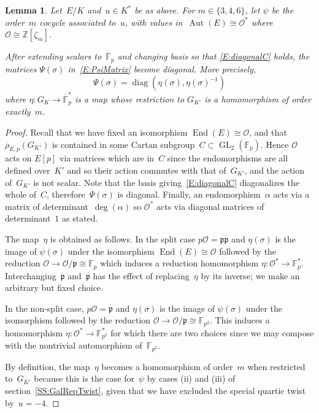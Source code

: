 \documentclass[twoside,leqno,symbols-for-thanks, draft]{rmi}
\numberwithin{equation}{section}
\newcommand{\F}{\mathbb{F}}
\newcommand{\Fp}{\mathbb{F}_p}
\newcommand{\Fpstar}{\mathbb{F}_p^*}
\newcommand{\Fbar}{{\overline{\F}}}
\newcommand{\Z}{\mathbb{Z}}
\newcommand{\rhobar}{{\overline{\rho}}}
\newcommand{\frp}{{\mathfrak p}}
\newcommand{\calO}{\mathcal{O}}
\DeclareMathOperator{\Aut}{Aut}
\DeclareMathOperator{\End}{End}
\newcommand{\GL}{\operatorname{GL}}
\newcommand{\diag}{{\operatorname{diag}}}
\newtheorem{lemma}[theorem]{Lemma}
\theoremstyle{remark}
\begin{document}
\begin{lemma}\label{L:DiagonalPsi}
Let~$E/K$ and~$u\in K^*$ be as above.  For $m\in\{3,4,6\}$, let $\psi$
be the order~$m$ cocycle associated to~$u$, with values
in~$\Aut(E)\cong\calO^*$ where $\calO\cong\Z[\zeta_m]$.

After extending scalars to~$\Fbar_p$ and changing basis so that
\eqref{E:diagonalC} holds, the matrices $\Psi(\sigma)$
in~\eqref{E:PsiMatrix} become diagonal.  More precisely,
\[
\Psi(\sigma) = \diag(\eta(\sigma),\eta(\sigma)^{-1})
\]
where $\eta:G_K\to \overline{\F}_p^*$ is a map whose restriction to
$G_{K'}$ is a homomorphism of order exactly~$m$.
\end{lemma}
\begin{proof}
Recall that we have fixed an isomorphism $\End(E)\cong\calO$, and that
$\rhobar_{E,p}(G_{K'})$ is contained in some Cartan subgroup~$C
\subset \GL_2(\Fp)$.  Hence $\calO$ acts on $E[p]$ via matrices which
are in~$C$ since the endomorphisms are all defined over~$K'$ and so
their action commutes with that of~$G_{K'}$, and the action
of~$G_{K'}$ is not scalar. Note that the basis
giving~\eqref{E:diagonalC} diagonalizes the whole of~$C$,
therefore~$\Psi(\sigma)$ is diagonal. Finally, an
endomorphism~$\alpha$ acts via a matrix of determinant~$\deg(\alpha)$
so $\calO^*$ acts via diagonal matrices of determinant~$1$ as stated.

The map~$\eta$ is obtained as follows.  In the split case
$p\calO=\frp\overline{\frp}$ and $\eta(\sigma)$ is the image of
$\psi(\sigma)$ under the isomorphism
$\End(E)\cong\calO$ followed by the reduction
$\calO\to\calO/\frp\cong\Fp$ which induces a reduction homomorphism
$\eta:\calO^*\to\Fpstar$.  Interchanging~$\frp$ and~$\overline{\frp}$
has the effect of replacing~$\eta$ by its inverse; we make an
arbitrary but fixed choice.

In the non-split case, $p\calO=\frp$ and 
$\eta(\sigma)$ is the image
of $\psi(\sigma)$ under the isomorphism followed by the reduction
$\calO\to\calO/\frp\cong\F_{p^2}$. 
This induces a 
homomorphism $\eta: \calO^*\to\F_{p^2}^*$ for which there are two
choices since we may compose with the nontrivial
automorphism of~$\F_{p^2}$.

By definition, the map~$\eta$ becomes a homomorphism of order~$m$ when restricted to~$G_{K'}$ because this is the case for~$\psi$ by cases (ii) and (iii) 
of section~\ref{SS:GalRepTwist}, given that we have excluded the special quartic twist by~$u=-4$.
\end{proof}
\end{document}
